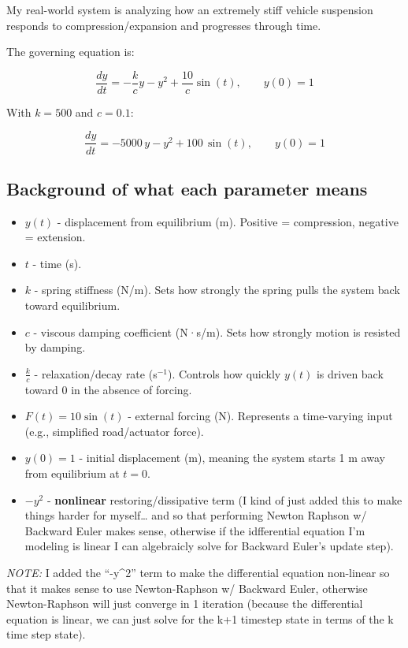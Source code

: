 \documentclass[11pt]{article}
\begin{document}
My real-world system is analyzing how an extremely stiff vehicle
suspension responds to compression/expansion and progresses through
time.

The governing equation is:

\[\frac{dy}{dt} = -\frac{k}{c}y - y^2 + \frac{10}{c}\sin(t), \qquad y(0)=1\]

With \(k=500\) and \(c=0.1\):

\[\frac{dy}{dt} = -5000\,y - y^2 + 100\,\sin(t), \qquad y(0)=1\]

\subsection{Background of what each parameter
means}\label{background-of-what-each-parameter-means}

\begin{itemize}
\item
  \textbf{\(y(t)\)} - displacement from equilibrium (m). Positive =
  compression, negative = extension.
\item
  \textbf{\(t\)} - time (s).
\item
  \textbf{\(k\)} - spring stiffness (N/m). Sets how strongly the spring
  pulls the system back toward equilibrium.
\item
  \textbf{\(c\)} - viscous damping coefficient (N·s/m). Sets how
  strongly motion is resisted by damping.
\item
  \textbf{\(\frac{k}{c}\)} - relaxation/decay rate (s\(^{-1}\)).
  Controls how quickly \(y(t)\) is driven back toward 0 in the absence
  of forcing.
\item
  \textbf{\(F(t)=10\sin(t)\)} - external forcing (N). Represents a
  time-varying input (e.g., simplified road/actuator force).
\item
  \textbf{\(y(0)=1\)} - initial displacement (m), meaning the system
  starts 1 m away from equilibrium at \(t=0\).
\item
  \textbf{\(-y^2\)} - \textbf{nonlinear} restoring/dissipative term (I
  kind of just added this to make things harder for myself\ldots{} and
  so that performing Newton Raphson w/ Backward Euler makes sense,
  otherwise if the idfferential equation I'm modeling is linear I can
  algebraicly solve for Backward Euler's update step).
\end{itemize}

\emph{NOTE:} I added the ``-y\^{}2'' term to make the differential
equation non-linear so that it makes sense to use Newton-Raphson w/
Backward Euler, otherwise Newton-Raphson will just converge in 1
iteration (because the differential equation is linear, we can just
solve for the k+1 timestep state in terms of the k time step state).
\end{document}
